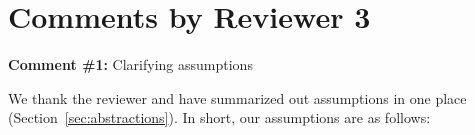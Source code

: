 

%  
% 
% 
% 
% 



\section*{Comments by Reviewer 3}

\noindent
\textbf{Comment \#1:} Clarifying assumptions
\begin{quote}
\end{quote}

We thank the reviewer and have summarized out assumptions in one place (Section~\ref{sec:abstractions}).
In short, our assumptions are as follows:

